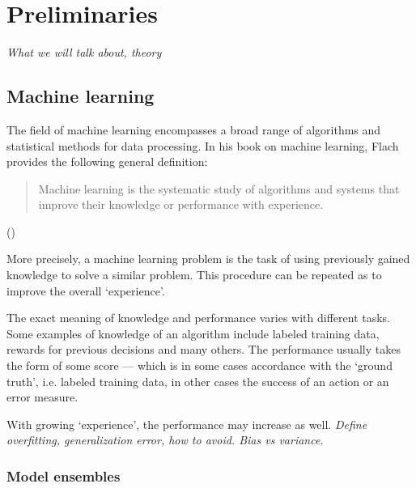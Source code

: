 \chapter{Preliminaries}

\textit{What we will talk about, theory}

\section{Machine learning}
The field of machine learning encompasses a broad range of algorithms and statistical methods for data processing. In his book on machine learning, Flach provides the following general definition:

\blockquote{Machine learning is the systematic study of algorithms and systems that improve their knowledge or performance with experience.} (\citet{Flach:2012:MLA:2490546}) %

More precisely, a machine learning problem is the task of using previously gained knowledge to solve a similar problem. This procedure can be repeated as to improve the overall `experience'.

The exact meaning of knowledge and performance varies with different tasks. Some examples of knowledge of an algorithm include labeled training data, rewards for previous decisions and many others. The performance usually takes the form of some score --- which is in some cases accordance with the `ground truth', i.e. labeled training data, in other cases the success of an action or an error measure. %


With growing `experience', the performance may increase as well.
\textit{Define overfitting, generalization error, how to avoid. Bias vs variance.}

\subsection{Model ensembles}
